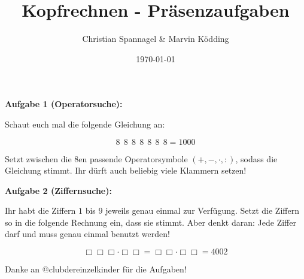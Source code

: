 \documentclass{cssheet}
\title{Kopfrechnen - Präsenzaufgaben}
\author{Christian Spannagel \& Marvin Ködding}
\date{\today}
\begin{document}
\printtitle

\textbf{Aufgabe 1 (Operatorsuche):} 

Schaut euch mal die folgende Gleichung an:

$$8~~8~~8~~8~~8~~8~~8 = 1000$$

Setzt zwischen die 8en passende Operatorsymbole $(+, -, \cdot, :)$, sodass die Gleichung stimmt. Ihr dürft auch beliebig viele Klammern setzen!

\textbf{Aufgabe 2 (Ziffernsuche):} 

Ihr habt die Ziffern $1$ bis $9$ jeweils genau einmal zur Verfügung. Setzt die Ziffern so in die folgende Rechnung ein, dass sie stimmt. Aber denkt daran: Jede Ziffer darf und muss genau einmal benutzt werden!

$$\Box \Box \Box \cdot \Box \Box = \Box \Box \cdot \Box \Box  = 4002$$

\vspace*{10mm}
Danke an @clubdereinzelkinder für die Aufgaben!

\vspace*{5mm}
\printlicense

\printsocials
\end{document}
